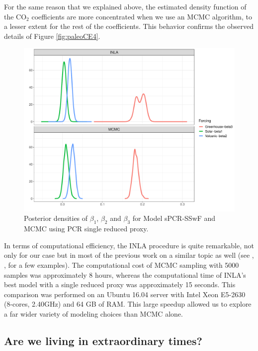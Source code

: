 \documentclass[12pt]{amsart}
\theoremstyle{plain}
\theoremstyle{definition}
\theoremstyle{remark}
\newcommand{\lb}[1]{\color{MidnightBlue}\textbf{[LB: #1]}\normalcolor}
\newcommand{\jeg}[1]{\color{ProcessBlue}\textbf{[JEG: #1]}\normalcolor}
\begin{document}
For the same reason that we explained above, the estimated density
function of the CO$_2$ coefficients are more
concentrated when we use an MCMC algorithm, to a lesser extent for the rest of the
coefficients. This behavior confirms the observed details of Figure
\ref{fig:paleoCE4}. 

\begin{figure}
  \centering
  \includegraphics[scale=0.40]{PlotBetas}
  \caption{Posterior densities of $\beta_1$, $\beta_2$ and $\beta_3$ for Model
    sPCR-SSwF and MCMC using PCR single reduced proxy.}
  \label{fig:betas}
\end{figure}

In terms of computational efficiency, the INLA procedure is quite remarkable, not only
for our case but in most of the previous work on a similar topic as well (see \cite{Rue2009},
\cite{Blangiardo2013}, \cite{Ruiz-Cardenas2012} for a few examples). The
computational cost of MCMC sampling with 5000 samples was
approximately 8 hours, whereas the computational time of INLA's best model with
a single reduced proxy was approximately 15 seconds. This comparison
was performed on an Ubuntu 16.04 server with Intel Xeon E5-2630 (8-cores,
2.40GHz) and 64 GB of RAM.  This large speedup allowed us to explore a far wider variety of modeling choices than MCMC alone.


\subsection{Are we living in extraordinary times?}

\end{document}
